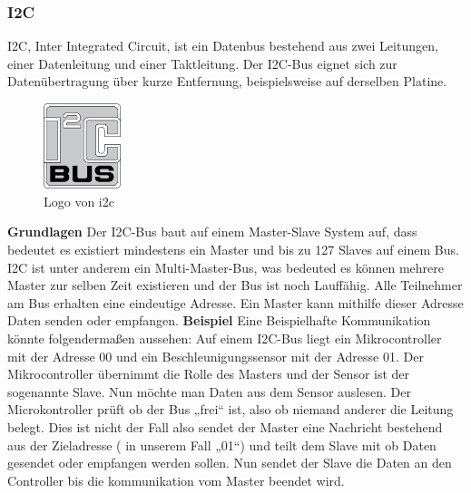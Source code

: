 \subsubsection{I2C}
\label{subsec:I2C}
I2C, Inter Integrated Circuit, ist ein Datenbus bestehend aus zwei Leitungen, einer Datenleitung und einer Taktleitung. Der I2C-Bus eignet sich zur Datenübertragung über kurze Entfernung, beispielsweise auf derselben Platine.

\begin{figure}
  \begin{center}
    \includegraphics[width=0.2\textwidth]{images/i2c}
  \end{center}
  \caption{Logo von i2c \cite{PERT.CH2-i2c.logo}}\label{Fig:imgi2cLogo}
\end{figure}

\textbf{Grundlagen\newline}
Der I2C-Bus baut auf einem Master-Slave System auf, dass bedeutet es existiert mindestens ein Master und bis zu 127 Slaves auf einem Bus. I2C ist unter anderem ein Multi-Master-Bus, was bedeuted es können mehrere Master zur selben Zeit existieren und der Bus ist noch Lauffähig.
Alle Teilnehmer am Bus erhalten eine eindeutige Adresse. Ein Master kann mithilfe dieser Adresse Daten senden oder empfangen.
\nextline
\textbf{Beispiel\nextline}
Eine Beispielhafte Kommunikation könnte folgendermaßen aussehen:
\nextline
Auf einem I2C-Bus liegt ein Mikrocontroller mit der Adresse 00 und ein Beschleunigungssensor mit der Adresse 01. Der Mikrocontroller übernimmt die Rolle des Masters und der Sensor ist der sogenannte Slave. Nun möchte man Daten aus dem Sensor auslesen. Der Microkontroller prüft ob der Bus „frei“ ist, also ob niemand anderer die Leitung belegt. Dies ist nicht der Fall also sendet der Master eine Nachricht bestehend aus der Zieladresse ( in unserem Fall „01“) und teilt dem Slave mit ob Daten gesendet oder empfangen werden sollen. Nun sendet der Slave die Daten an den Controller bis die kommunikation vom Master beendet wird.


\clearpage %